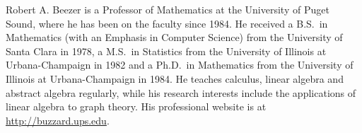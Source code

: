 \noindent
Robert A. Beezer is a Professor of Mathematics at the University of Puget Sound, where he has been on the faculty since 1984.  He received a B.S.\ in Mathematics (with an Emphasis in Computer Science) from the University of Santa Clara in 1978, a M.S.\ in Statistics from the University of Illinois at Urbana-Champaign in 1982 and a Ph.D.\ in Mathematics from the University of Illinois at Urbana-Champaign in 1984.  He teaches calculus, linear algebra and abstract algebra regularly, while his research interests include the applications of linear algebra to graph theory.  His professional website is at \url{http://buzzard.ups.edu}.